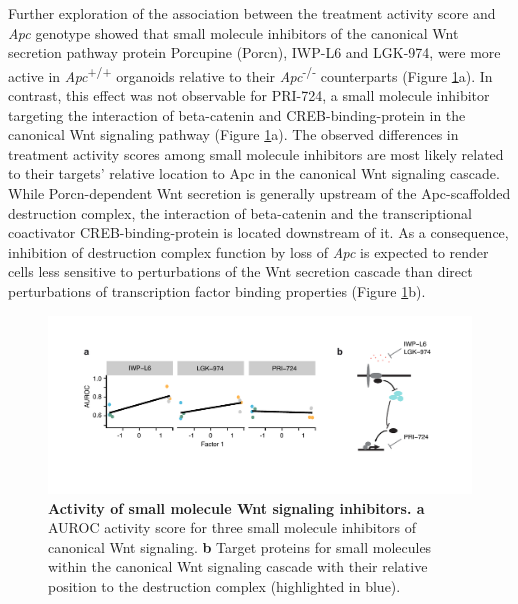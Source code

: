 \begin{flushleft}
Further exploration of the association between the treatment activity score and \textit{Apc} genotype showed that small molecule inhibitors of the canonical Wnt secretion pathway protein Porcupine (Porcn), IWP-L6 and LGK-974, were more active in \textit{Apc}\textsuperscript{+/+} organoids relative to their \textit{Apc}\textsuperscript{-/-}  counterparts \citep{liuTargetingWntdrivenCancer2013} (Figure \ref{fig_199}a). In contrast, this effect was not observable for PRI-724, a small molecule inhibitor targeting the interaction of beta-catenin and CREB-binding-protein in the canonical Wnt signaling pathway \citep{okazakiNovelInhibitorPRI7242019} (Figure \ref{fig_199}a). The observed differences in treatment activity scores among small molecule inhibitors are most likely related to their targets' relative location to Apc in the canonical Wnt signaling cascade. While Porcn-dependent Wnt secretion is generally upstream of the Apc-scaffolded destruction complex, the interaction of beta-catenin and the transcriptional coactivator CREB-binding-protein is located downstream of it. As a consequence, inhibition of destruction complex function by loss of \textit{Apc} is expected to render cells less sensitive to perturbations of the Wnt secretion cascade than direct perturbations of transcription factor binding properties (Figure \ref{fig_199}b).

\begin{figure}[h!]
\centering
\includegraphics[scale=0.75,keepaspectratio]{figures/adenomaprofiling/pdf/fig_2_2_1.pdf}
\caption[Activity of small molecule Wnt signaling inhibitors]{\textbf{Activity of small molecule Wnt signaling inhibitors. a} AUROC activity score for three small molecule inhibitors of canonical Wnt signaling. \textbf{b} Target proteins for small molecules within the canonical Wnt signaling cascade with their relative position to the destruction complex (highlighted in blue).}
\label{fig_199}
\end{figure}
\bigbreak


\end{flushleft}
